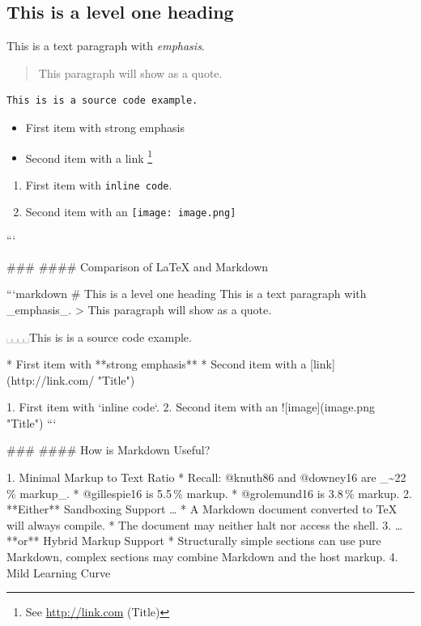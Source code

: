 \documentclass{beamer}
\begin{document}
\begin{darkframes}
\begin{frame}
\section{This is a level one heading}
This is a text paragraph with \emph{emphasis}.
\begin{quotation}This paragraph will show as a quote.\end{quotation}
\begin{verbatim}
This is is a source code example.
\end{verbatim}
\begin{itemize}
  \item First item with \alert{strong emphasis}
  \item Second item with a link%
    \footnote{See \url{http://link.com} (Title)}
\end{itemize}
\begin{enumerate}
  \item First item with \verb`inline code`.
  \item Second item with an \texttt{[image: image.png]}
\end{enumerate}
```

\end{frame}
\begin{frame}

### \subsecname
#### Comparison of \LaTeX{} and Markdown

```markdown
# This is a level one heading
This is a text paragraph with _emphasis_.
> This paragraph will show as a quote.

␣␣␣␣This is is a source code example.

* First item with **strong emphasis**
* Second item with a [link](http://link.com/ "Title")

1. First item with `inline code`.
2. Second item with an ![image](image.png "Title")
```

\end{frame}
\begin{frame}

### \subsecname
#### How is Markdown Useful?

  1. Minimal Markup to Text Ratio
    * Recall: @knuth86 and @downey16 are _\textasciitilde 22\,\% markup_.
    * @gillespie16 is 5.5\,\% markup.
    * @grolemund16 is 3.8\,\% markup.
  2. **Either** Sandboxing Support …
    * A Markdown document converted to \TeX{} will always compile.
    * The document may neither halt nor access the shell.
  3. … **or** Hybrid Markup Support
    * Structurally simple sections can use pure Markdown, complex sections
      may combine Markdown and the host markup.
  4. Mild Learning Curve


\end{frame}
\end{darkframes}
\end{document}
